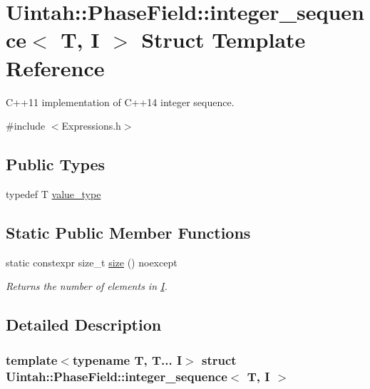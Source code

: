 \hypertarget{structUintah_1_1PhaseField_1_1integer__sequence}{}\section{Uintah\+:\+:Phase\+Field\+:\+:integer\+\_\+sequence$<$ T, I $>$ Struct Template Reference}
\label{structUintah_1_1PhaseField_1_1integer__sequence}


C++11 implementation of C++14 integer sequence.  




{\ttfamily \#include $<$Expressions.\+h$>$}

\subsection*{Public Types}
\begin{DoxyCompactItemize}
\item 
typedef T \hyperlink{structUintah_1_1PhaseField_1_1integer__sequence_a3bd68d516fd31a6433124da9181cf5d7}{value\+\_\+type}
\end{DoxyCompactItemize}
\subsection*{Static Public Member Functions}
\begin{DoxyCompactItemize}
\item 
static constexpr size\+\_\+t \hyperlink{structUintah_1_1PhaseField_1_1integer__sequence_af392cbbe56b45f3e350d9d3e46f9fcdc}{size} () noexcept
\begin{DoxyCompactList}\small\item\em Returns the number of elements in \hyperlink{structUintah_1_1PhaseField_1_1I}{I}. \end{DoxyCompactList}\end{DoxyCompactItemize}


\subsection{Detailed Description}
\subsubsection*{template$<$typename T, T... I$>$\newline
struct Uintah\+::\+Phase\+Field\+::integer\+\_\+sequence$<$ T, I $>$}

